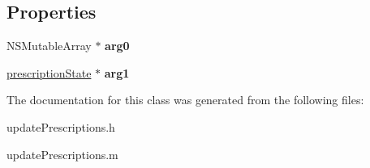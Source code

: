 \subsection*{Properties}
\begin{DoxyCompactItemize}
\item 
\hypertarget{interfaceupdate_prescriptions_a24dbf9737618b7e8efe28850b1f67ddf}{}N\+S\+Mutable\+Array $\ast$ {\bfseries arg0}\label{interfaceupdate_prescriptions_a24dbf9737618b7e8efe28850b1f67ddf}

\item 
\hypertarget{interfaceupdate_prescriptions_a38cf5231228b365967463ad8400cb439}{}\hyperlink{interfaceprescription_state}{prescription\+State} $\ast$ {\bfseries arg1}\label{interfaceupdate_prescriptions_a38cf5231228b365967463ad8400cb439}

\end{DoxyCompactItemize}


The documentation for this class was generated from the following files\+:\begin{DoxyCompactItemize}
\item 
update\+Prescriptions.\+h\item 
update\+Prescriptions.\+m\end{DoxyCompactItemize}
